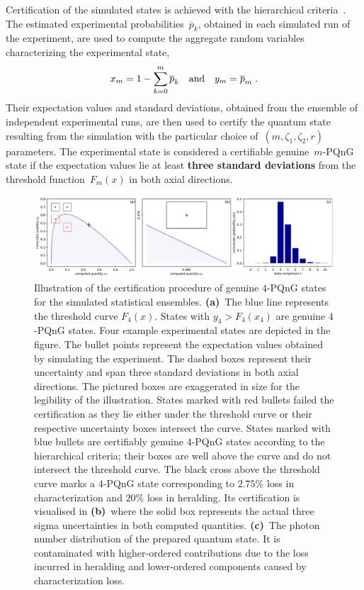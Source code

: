 \documentclass{article}
\begin{document}
Certification of the simulated states is achieved with the hierarchical criteria~\cite{lachman2019}. The estimated experimental probabilities~$\overline{p}_{k}$, obtained in each simulated run of the experiment, are used to compute the aggregate random variables characterizing the experimental state,
%
\begin{equation}
  x_{m} = 1 - \sum_{k = 0}^{m} \overline{p}_{k} 
  \quad\text{and}\quad
  y_{m} = \overline{p}_{m} 
  \;\text{.}
\end{equation}
%
Their expectation values and standard deviations, obtained from the ensemble of independent experimental runs, are then used to certify the quantum state resulting from the simulation with the particular choice of~${(m, \zeta_{1}, \zeta_{2}, r)}$ parameters. The experimental state is considered a certifiable genuine~$m$-PQnG state if the expectation values lie at least \textbf{three standard deviations} from the threshold function~$F_{m} (x)$ in both axial directions.

\begin{figure}[h]
  \bgroup
    \hspace*{-0.125\columnwidth}%
    \includegraphics[width = 1.25 \columnwidth]{import/illustrate_process.pdf}
  \egroup
  \caption{
    Illustration of the certification procedure of genuine $4$-PQnG states for the simulated statistical ensembles. \textbf{(a)}~The blue line represents the threshold curve $F_{4} (x)$. States with $y_{4} > F_{4}(x_{4})$ are genuine $4$-PQnG states. Four example experimental states are depicted in the figure. The bullet points represent the expectation values obtained by simulating the experiment. The dashed boxes represent their uncertainty and span three standard deviations in both axial directions. The pictured boxes are exaggerated in size for the legibility of the illustration. States marked with red bullets failed the certification as they lie either under the threshold curve or their respective uncertainty boxes intersect the curve. States marked with blue bullets are certifiably genuine $4$-PQnG states according to the hierarchical criteria; their boxes are well above the curve and do not intersect the threshold curve. The black cross above the threshold curve marks a $4$-PQnG state corresponding to
    $2.75\%$ loss in characterization and $20\%$ loss in heralding. Its certification is visualised in \textbf{(b)}~where the solid box represents the actual three sigma uncertainties in both computed quantities. \textbf{(c)}~The photon number distribution of the prepared quantum state. It is contaminated with higher-ordered contributions due to the loss incurred in heralding and lower-ordered components caused by characterization loss.
  }
  \label{f-il}
\end{figure}
\end{document}
